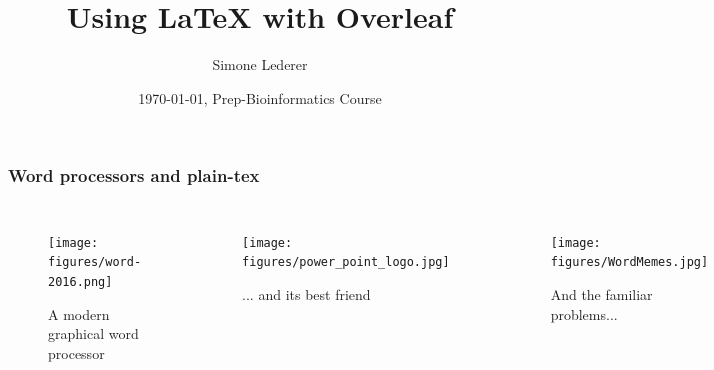 \documentclass{beamer}
\title[Basic \LaTeX{}]{Using \LaTeX{} with Overleaf}
\author{Simone Lederer}
\institute[]
{Algorithms in Bioinformatics, ZBIT\\
  University of T\"{u}bingen \\ 
}
\date[Vorkurs WiSe 2020/21]{\monthyeardate\today, Prep-Bioinformatics Course}
\begin{document}

\begin{frame} %
\frametitle{Word processors and plain-tex}
\begin{columns}
    \begin{figure}
        \caption{A modern graphical word processor}
        \texttt{[image: figures/word-2016.png]}
    \end{figure}
    \begin{figure}
        \caption{... and its best friend}
        \texttt{[image: figures/power\_point\_logo.jpg]}
    \end{figure}
    \begin{figure}
        \caption{And the familiar problems...}
        \texttt{[image: figures/WordMemes.jpg]}
    \end{figure}
\end{columns}
\end{frame}
\end{document}
